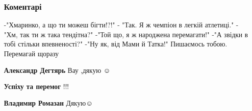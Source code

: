  
 
 
 
 
\subsubsection{Коментарі}

\begin{itemize}
 

\obeycr
-"Хмаринко, а що ти можеш бігти!?!"
- "Так. Я ж чемпіон в легкій атлетиці."
-"Хм, так ти ж така тендітна?"
-"Той що, я ж народжена перемагати!"
-"А звідки в тобі стільки впевненості?"
-"Ну як, від Мами й Татка!"
Пишаємось тобою. Перемагай щоразу🥰🥰🥰
\restorecr

 
\textbf{Александр Дегтярь} Вау ,дякую ☺️

 
\textbf{Успіху та перемог} !!!👋💯


 
\textbf{Владимир Ромазан} Дякую☺️

 

\end{itemize}
